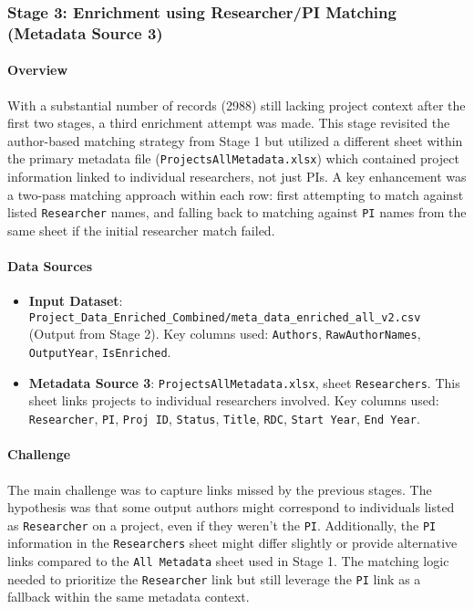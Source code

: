 \documentclass[12pt]{article}
\providecommand{\tightlist}{%
  \setlength{\itemsep}{0pt}\setlength{\parskip}{0pt}}
\begin{document}
\subsubsection{Stage 3: Enrichment using Researcher/PI Matching
(Metadata Source
3)}\label{stage-3-enrichment-using-researcherpi-matching-metadata-source-3}

\paragraph{Overview}\label{overview-5}

With a substantial number of records (2988) still lacking project
context after the first two stages, a third enrichment attempt was made.
This stage revisited the author-based matching strategy from Stage 1 but
utilized a different sheet within the primary metadata file
(\texttt{ProjectsAllMetadata.xlsx}) which contained project information
linked to individual researchers, not just PIs. A key enhancement was a
two-pass matching approach within each row: first attempting to match
against listed \texttt{Researcher} names, and falling back to matching
against \texttt{PI} names from the same sheet if the initial researcher
match failed.

\paragraph{Data Sources}\label{data-sources-4}

\begin{itemize}
\tightlist
\item
  \textbf{Input Dataset}:
  \texttt{Project\_Data\_Enriched\_Combined/meta\_data\_enriched\_all\_v2.csv}
  (Output from Stage 2). Key columns used: \texttt{Authors},
  \texttt{RawAuthorNames}, \texttt{OutputYear}, \texttt{IsEnriched}.
\item
  \textbf{Metadata Source 3}: \texttt{ProjectsAllMetadata.xlsx}, sheet
  \texttt{Researchers}. This sheet links projects to individual
  researchers involved. Key columns used: \texttt{Researcher},
  \texttt{PI}, \texttt{Proj\ ID}, \texttt{Status}, \texttt{Title},
  \texttt{RDC}, \texttt{Start\ Year}, \texttt{End\ Year}.
\end{itemize}

\paragraph{Challenge}\label{challenge-2}

The main challenge was to capture links missed by the previous stages.
The hypothesis was that some output authors might correspond to
individuals listed as \texttt{Researcher} on a project, even if they
weren't the \texttt{PI}. Additionally, the \texttt{PI} information in
the \texttt{Researchers} sheet might differ slightly or provide
alternative links compared to the \texttt{All\ Metadata} sheet used in
Stage 1. The matching logic needed to prioritize the \texttt{Researcher}
link but still leverage the \texttt{PI} link as a fallback within the
same metadata context.
\end{document}
